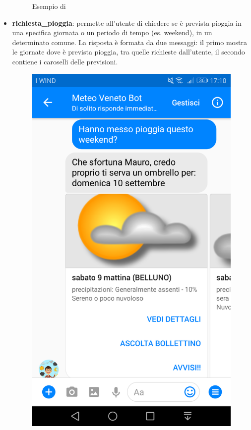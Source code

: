 \begin{itemize}
\begin{figure}[h!]
		\caption{Esempio di }
	\end{figure}	
	\item \textbf{richiesta\_pioggia}: permette all'utente di chiedere se è prevista pioggia in una specifica giornata o un periodo di tempo (es. weekend), in un determinato comune. La risposta è formata da due messaggi: il primo mostra le giornate dove è prevista pioggia, tra quelle richieste dall'utente, il secondo contiene i caroselli delle previsioni.
	\begin{figure}[h!]
		\centering
		\includegraphics[scale=0.12]{../Immagini/richiesta_pioggia.png}%

\end{figure}
\end{itemize}
